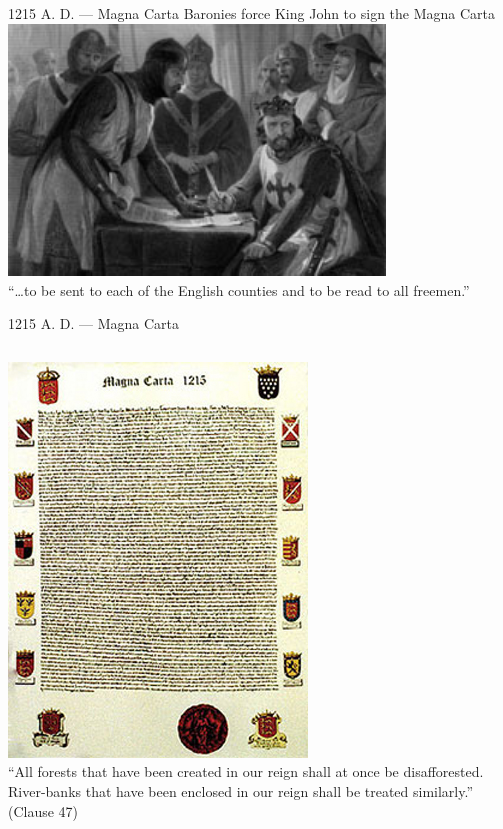 \documentclass{beamer}
\begin{document}
\begin{frame}{1215 A. D. --- Magna Carta}
    \centering
    Baronies force King John to sign the Magna Carta \\
    \includegraphics[width=0.75\textwidth]{img/king-john.png} \\
    ``\ldots to be sent to each of the English counties and to be read to all freemen.'' \\
\end{frame}

\begin{frame}{1215 A. D. --- Magna Carta}
    \begin{columns}[onlytextwidth]
            \centering
            \includegraphics[height=0.55\textheight]{img/magna-carta.png} \\

            ``All forests that have been created in our reign shall at once be disafforested.  River-banks that have been enclosed in our reign shall be treated similarly.'' \\
            (Clause 47)  \\
    \end{columns}
\end{frame}
\end{document}
